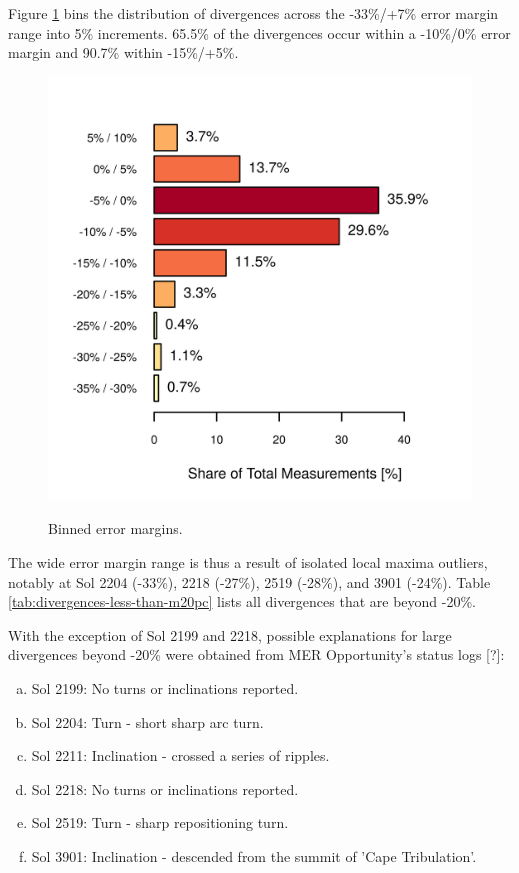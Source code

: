 \clearpage

Figure \ref{fig:plot:binned-error-margins} bins the distribution of divergences across the -33\%/+7\% error margin range into 5\% increments. 65.5\% of the divergences occur within a -10\%/0\% error margin and 90.7\%  within -15\%/+5\%.

\begin{figure}[h]
  \centering
  \hypersetup{linkcolor=captionTextColor}
  \includegraphics[width=0.8\linewidth]{sections/power-and-energy-predictions/plots/binned-error-margins.png}\\
  \caption[Binned error margins]
          {Binned error margins.}
  \label{fig:plot:binned-error-margins}
\end{figure}

The wide error margin range is thus a result of isolated local maxima outliers, notably at Sol 2204 (-33\%), 2218 (-27\%), 2519 (-28\%), and 3901 (-24\%). Table \ref{tab:divergences-less-than-m20pc} lists all divergences that are beyond -20\%.



With the exception of Sol 2199 and 2218, possible explanations for large divergences beyond -20\% were obtained from MER Opportunity's status logs [?]:
\begin{enumerate}[(a)]
  \item Sol 2199: No turns or inclinations reported.
  \item Sol 2204: Turn - short sharp arc turn.
  \item Sol 2211: Inclination - crossed a series of ripples.
  \item Sol 2218: No turns or inclinations reported.
  \item Sol 2519: Turn - sharp repositioning turn.
  \item Sol 3901: Inclination - descended from the summit of 'Cape Tribulation'.
\end{enumerate}

